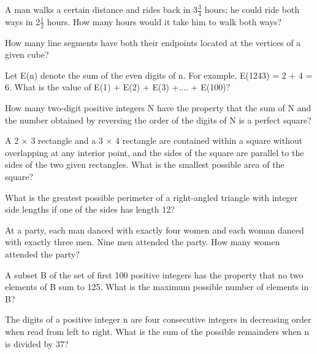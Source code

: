\item A man walks a certain distance and rides back in $3\frac{3}{4}$ hours; he could ride both ways in $2\frac{1}{2}$ hours. How many hours would it take him to walk both ways?

\item How many line segments have both their endpoints located at the vertices of a given cube?

\item Let E(n) denote the sum of the even digits of n. For example, E(1243) = 2 + 4 = 6. What is the value of E(1) + E(2) + E(3) +.... + E(100)?

\item How many two-digit positive integers N have the property that the sum of N and the number obtained by reversing the order of the digits of N is a perfect square?

\item A 2 $\times$ 3 rectangle and a 3 $\times$ 4 rectangle are contained within a square without overlapping at any interior point, and the sides of the square are parallel to the sides of the two given rectangles. What is the smallest possible area of the square?

\item What is the greatest possible perimeter of a right-angled triangle with integer side lengths if one of the sides has length 12?

\item At a party, each man danced with exactly four women and each woman danced with exactly three men. Nine men attended the party. How many women attended the party?

\item A subset B of the set of first 100 positive integers has the property that no two elements of B sum to 125. What is the maximum possible number of elements in B?

\item The digits of a positive integer n are four consecutive integers in decreasing order when read from left to right. What is the sum of the possible remainders when n is divided by 37?
